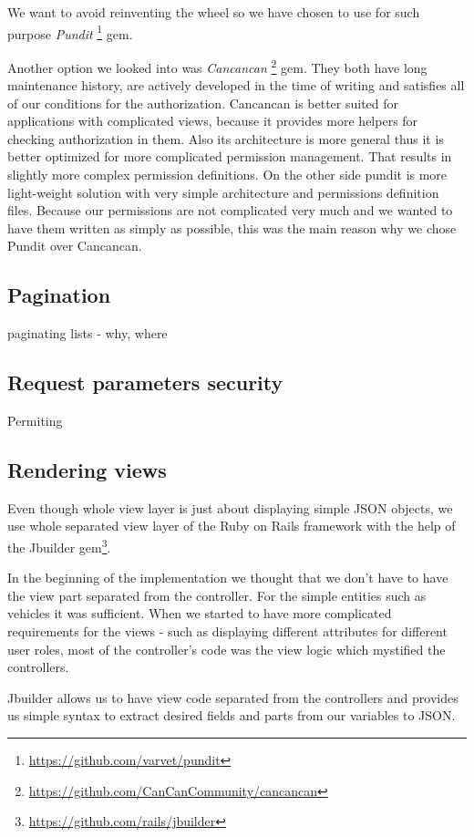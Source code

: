 We want to avoid reinventing the wheel so we have chosen to use for such purpose \textit{Pundit} \footnote{\url{https://github.com/varvet/pundit}} gem. 

Another option we looked into was \textit{Cancancan} \footnote{\url{https://github.com/CanCanCommunity/cancancan}} gem. They both have long maintenance history, are actively developed in the time of writing and satisfies all of our conditions for the authorization. Cancancan is better suited for applications with complicated views, because it provides more helpers for checking authorization in them. Also its architecture is more general thus it is better optimized for more complicated permission management. That results in slightly more complex permission definitions. On the other side pundit is more light-weight solution with very simple architecture and permissions definition files. Because our permissions are not complicated very much and we wanted to have them written as simply as possible, this was the main reason why we chose Pundit over Cancancan.

 \subsection{Pagination}
 paginating lists - why, where
\subsection{Request parameters security}
Permiting

\subsection{Rendering views}
	Even though whole view layer is just about displaying simple JSON objects, we use whole separated view layer of the Ruby on Rails framework with the help of the Jbuilder gem\footnote{\url{https://github.com/rails/jbuilder}}.
	
	In the beginning of the implementation we thought that we don't have to have the view part separated from the controller. For the simple entities such as vehicles it was sufficient. When we started to have more complicated requirements for the views - such as displaying different attributes for different user roles, most of the controller's code was the view logic which mystified the controllers.
	
	Jbuilder allows us to have view code separated from the controllers and provides us simple syntax to extract desired fields and parts from our variables to JSON.
